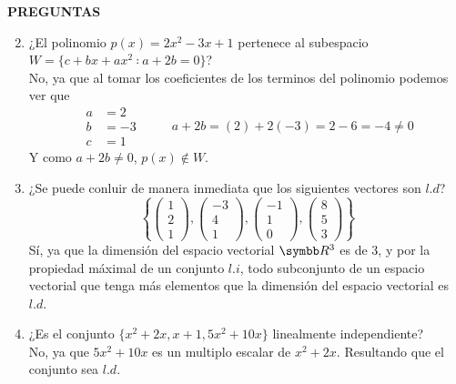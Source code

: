 \item \textbf{PREGUNTAS}
    \begin{enumerate}[label=\listAlph]
        \setcounter{enumii}{1} 
        \item ¿El polinomio \(p(x) = 2x^2 − 3x + 1\) pertenece al subespacio \(W = \{c + bx + ax^2 ∶ a + 2b = 0\}\)? \\
            No, ya que al tomar los coeficientes de los terminos del polinomio podemos ver que
            \[
                \begin{aligned}
                    a &= 2 \\
                    b &= -3 \\
                    c &= 1
                \end{aligned}
                \hspace{1cm}
                a + 2b = (2) + 2(-3) = 2 - 6 = -4 \neq 0
            \]
            Y como \(a + 2b \neq 0\), \(p(x) \not\in W\).
        \item ¿Se puede conluir de manera inmediata que los siguientes vectores son \(l.d\)? 
            \[
                \left\{
                    \begin{pmatrix}1 \\ 2 \\ 1\end{pmatrix},
                    \begin{pmatrix}-3 \\ 4 \\ 1\end{pmatrix},
                    \begin{pmatrix}-1 \\ 1 \\ 0\end{pmatrix},
                    \begin{pmatrix}8 \\ 5 \\ 3\end{pmatrix}
                \right\}
            \]
            Sí, ya que la dimensión del espacio vectorial \(\realR^3\) es de 3, y por la propiedad máximal de un conjunto \(l.i\), 
            todo subconjunto de un espacio vectorial que tenga más elementos que la dimensión del espacio vectorial es \(l.d\).
        \setcounter{enumii}{5}
        \item ¿Es el conjunto \(\{x^2 + 2x, x + 1, 5x^2 + 10x\}\) linealmente independiente? \\
            No, ya que \(5x^2 + 10x\) es un multiplo escalar de \(x^2 + 2x\). Resultando que el conjunto sea \(l.d\).
    \end{enumerate}
